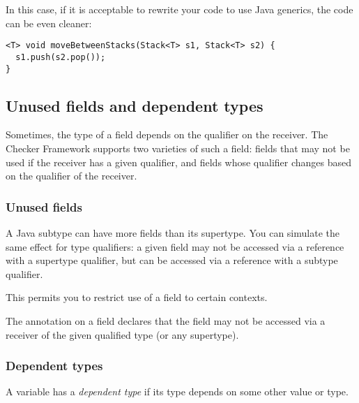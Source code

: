 \noindent
In this case, if it is acceptable to rewrite your code to use Java
generics, the code can be even cleaner:

\begin{Verbatim}
<T> void moveBetweenStacks(Stack<T> s1, Stack<T> s2) {
  s1.push(s2.pop());
}
\end{Verbatim}






\subsection{Unused fields and dependent types\label{unused-fields-and-dependent-types}}

Sometimes, the type of a field depends on the qualifier on the receiver.
The Checker Framework supports two varieties of such a field:  fields that
may not be used if the receiver has a given qualifier, and fields whose
qualifier changes based on the qualifier of the receiver.


\subsubsection{Unused fields\label{unused-fields}}

A Java subtype can have more fields than its supertype.  You can simulate
the same effect for type qualifiers:  a given field may not be accessed via
a reference with a supertype qualifier, but can be accessed via a reference
with a subtype qualifier.

This permits you to restrict use of a field to certain contexts.

The  annotation
on a field declares that the field may not be accessed via a receiver of
the given qualified type (or any supertype).


\subsubsection{Dependent types\label{dependent-types}}

A variable has a \emph{dependent type} if its type depends on some other
value or type.

